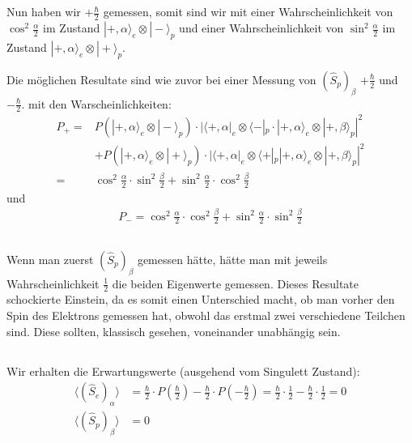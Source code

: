 \documentclass[11pt, ngerman, fleqn, DIV=15, headinclude]{scrartcl}
\begin{document}
\subsection{}
	Nun haben wir $+\frac{\hbar}{2}$ gemessen, somit sind wir mit einer Wahrscheinlichkeit von $\cos^2\frac{\alpha}{2}$ im Zustand $|+,\alpha\rangle_e\otimes|-\rangle_p$ und einer Wahrscheinlichkeit von $\sin^2\frac{\alpha}{2}$ im Zustand $|+,\alpha\rangle_e\otimes|+\rangle_p$.
	
	Die möglichen Resultate sind wie zuvor bei einer Messung von $(\hat{S}_p)_\beta$ $+\frac{\hbar}{2}$ und $-\frac{\hbar}{2}$. mit den Warscheinlichkeiten:
	\begin{align*}
		P_+=&P(|+,\alpha\rangle_e\otimes|-\rangle_p)\cdot |\langle+,\alpha|_e\otimes\langle-|_p\cdot |+,\alpha\rangle_e\otimes|+,\beta\rangle_p|^2  \\ &+ P(|+,\alpha\rangle_e\otimes|+\rangle_p) \cdot |\langle+,\alpha|_e\otimes\langle+|_p|+,\alpha\rangle_e\otimes|+,\beta\rangle_p|^2 \\
			=& \cos^2\frac{\alpha}{2} \cdot\sin^2\frac{\beta}{2}+ \sin^2\frac{\alpha}{2}\cdot\cos^2\frac{\beta}{2}
	\end{align*}
	und
	\begin{align*}
		P_-=\cos^2\frac{\alpha}{2} \cdot\cos^2\frac{\beta}{2}+ \sin^2\frac{\alpha}{2}\cdot\sin^2\frac{\beta}{2}
	\end{align*}

\subsection{}
	Wenn man zuerst $(\hat{S}_p)_\beta$ gemessen hätte, hätte man mit jeweils Wahrscheinlichkeit $\frac{1}{2}$ die beiden Eigenwerte gemessen. Dieses Resultate schockierte Einstein, da es somit einen Unterschied macht, ob man vorher den Spin des Elektrons gemessen hat, obwohl das erstmal zwei verschiedene Teilchen sind. Diese sollten, klassisch gesehen, voneinander unabhängig sein.

\subsection{}
	Wir erhalten die Erwartungswerte (ausgehend vom Singulett Zustand):
	\begin{align*}
		\langle(\hat{S}_e)_\alpha\rangle&= \frac{\hbar}{2}\cdot P\left( \frac{\hbar}{2}\right)- \frac{\hbar}{2}\cdot P\left(- \frac{\hbar}{2}\right)=  \frac{\hbar}{2}\cdot\frac{1}{2}- \frac{\hbar}{2}\cdot\frac{1}{2}=0 \\
		\langle(\hat{S}_p)_\beta\rangle&=0
	\end{align*}
	
\end{document}
